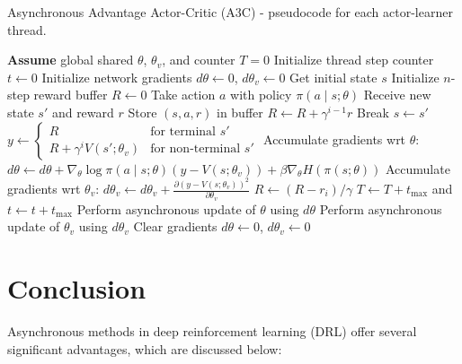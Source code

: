 \documentclass{article}
\begin{document}
\begin{algorithm}[H]
    \caption{Asynchronous Advantage Actor-Critic (A3C) - pseudocode for each actor-learner thread.}
    \begin{algorithmic}[1]
    \State \textbf{Assume} global shared \(\theta\), \(\theta_v\), and counter \(T = 0\)
    \State Initialize thread step counter \(t \gets 0\)
    \State Initialize network gradients \(d\theta \gets 0\), \(d\theta_v \gets 0\)
    \State Get initial state \(s\)
    \Repeat
        \State Initialize \(n\)-step reward buffer \(R \gets 0\)
            \State Take action \(a\) with policy \(\pi(a \mid s; \theta)\)
            \State Receive new state \(s'\) and reward \(r\)
            \State Store \((s, a, r)\) in buffer
            \State \(R \gets R + \gamma^{i-1} r\)
                \State Break
            \EndIf
            \State \(s \gets s'\)
        \EndFor
            \State \(y \gets 
                \begin{cases} 
                  R & \text{for terminal } s' \\
                  R + \gamma^i V(s'; \theta_v) & \text{for non-terminal } s'
                \end{cases}\)
            \State Accumulate gradients wrt \(\theta\): \(d\theta \gets d\theta + \nabla_{\theta} \log \pi(a \mid s; \theta) (y - V(s; \theta_v)) + \beta \nabla_{\theta} H(\pi(s; \theta))\)
            \State Accumulate gradients wrt \(\theta_v\): \(d\theta_v \gets d\theta_v + \frac{\partial (y - V(s; \theta_v))^2}{\partial \theta_v}\)
            \State \(R \gets (R - r_i) / \gamma\)
        \EndFor
        \State \(T \gets T + t_{\text{max}}\) and \(t \gets t + t_{\text{max}}\)
            \State Perform asynchronous update of \(\theta\) using \(d\theta\)
            \State Perform asynchronous update of \(\theta_v\) using \(d\theta_v\)
            \State Clear gradients \(d\theta \gets 0\), \(d\theta_v \gets 0\)
        \EndIf
    \end{algorithmic}
\end{algorithm}

\section{Conclusion}
Asynchronous methods in deep reinforcement learning (DRL) offer several significant advantages, which are discussed below:
\end{document}
